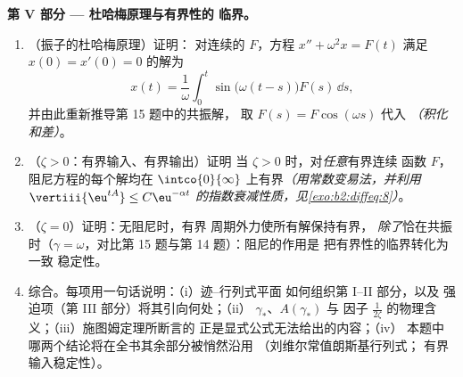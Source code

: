 \begin{problem}
\medskip
\noindent\textbf{第 V 部分 --- 杜哈梅原理与有界性的
临界。}
\begin{enumerate}[resume]
  \item （振子的杜哈梅原理）证明：
        对连续的 $F$，方程 $x'' + \omega^2x =
        F(t)$ 满足 $x(0) = x'(0) = 0$ 的解为
        \[
        x(t) = \frac1\omega\int_0^t\sin\bigl(\omega(t -
        s)\bigr)F(s)\,\dd s ,
        \]
        并由此重新推导第 15 题中的共振解，
        取 $F(s) = F\cos(\omega s)$ 代入
        \emph{（积化和差）}。
  \item （$\zeta > 0$：有界输入、有界输出）证明
        当 $\zeta > 0$ 时，对\emph{任意}有界连续
        函数 $F$，阻尼方程的每个解均在
        $\intco{0}{\infty}$ 上有界\emph{（用常数变易法，并利用
        $\vertiii{\eu^{tA}} \leq
        C\eu^{-\alpha t}$ 的指数衰减性质，见\cref{exo:b2:diffeq:8}）}。
  \item （$\zeta = 0$）证明：无阻尼时，有界
        周期外力使所有解保持有界，
        \emph{除了}恰在共振时（$\gamma =
        \omega$，对比第 15 题与第 14 题）：阻尼的作用是
        把有界性的临界转化为一致
        稳定性。
  \item 综合。每项用一句话说明：（i）迹--行列式平面
        如何组织第 I--II 部分，以及
        强迫项（第 III 部分）将其引向何处；（ii）
        $\gamma_*$、$A(\gamma_*)$ 与
        因子 $\frac1{2\zeta}$ 的物理含义；（iii）施图姆定理所断言的
        正是显式公式无法给出的内容；（iv）
        本题中哪两个结论将在全书其余部分被悄然沿用
        （刘维尔常值朗斯基行列式；
        有界输入稳定性）。
\end{enumerate}
\end{problem}

